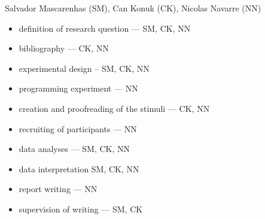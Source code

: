 \documentclass[10pt,letterpaper]{article}
\begin{document}
Salvador Mascarenhas (SM), Can Konuk (CK), Nicolas Navarre (NN)
\begin{itemize}
  \setlength\itemsep{0.01mm}
  \item definition of research question --- SM, CK, NN
  \item bibliography --- CK, NN
  \item experimental design -- SM, CK, NN
  \item programming experiment --- NN
  \item creation and proofreading of the stimuli --- CK, NN
  \item recruiting of participants --- NN
  \item data analyses --- SM, CK, NN
  \item data interpretation SM, CK, NN
  \item report writing --- NN
  \item supervision of writing --- SM, CK
\end{itemize}





\setlength{\bibleftmargin}{.125in}
\setlength{\bibindent}{-\bibleftmargin}

\def\thebibliography#1{\section*{References}
\fontsize{7.5}{8.5}\selectfont
 \list
 {[\arabic{enumi}]}{\leftmargin \parindent
   \itemindent -\parindent
   \itemsep 0ex plus 1pt
   \parsep 0.1ex plus 1pt minus 1pt
   \usecounter{enumi}}
   \def\newblock{\hskip .11em plus .33em minus .07em}
   \sloppy\clubpenalty4000\widowpenalty4000
   \sfcode`\.=1000\relax}


\end{document}
